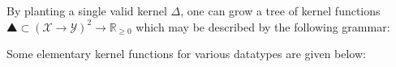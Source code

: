 \documentclass[11pt]{article}
\begin{document}
    \noindent By planting a single valid kernel $\Delta$, one can grow a tree of kernel functions $▲ \subset (\mathcal{X}→\mathcal{Y})^2 → \mathbb{R}_{\geq 0}$ which may be described by the following grammar:



    \noindent Some elementary kernel functions for various datatypes are given below:

\end{document}
